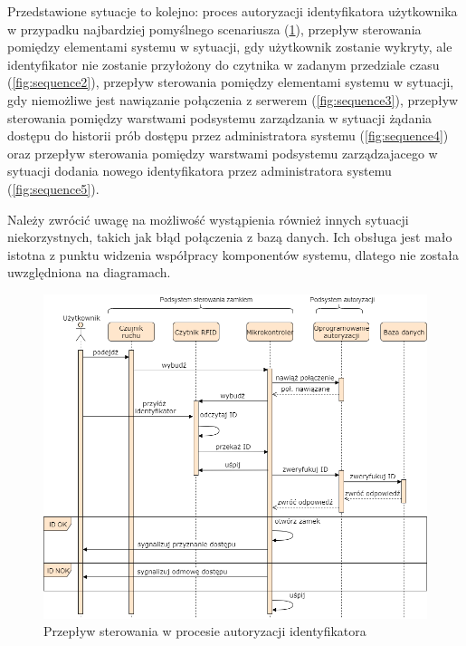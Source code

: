             Przedstawione sytuacje to kolejno: proces autoryzacji identyfikatora użytkownika w przypadku najbardziej pomyślnego scenariusza (\ref{fig:sequence1}), przepływ sterowania pomiędzy elementami systemu w sytuacji, gdy użytkownik zostanie wykryty, ale identyfikator nie zostanie przyłożony do czytnika w zadanym przedziale czasu (\ref{fig:sequence2}), przepływ sterowania pomiędzy elementami systemu w sytuacji, gdy niemożliwe jest nawiązanie połączenia z serwerem (\ref{fig:sequence3}), przepływ sterowania pomiędzy warstwami podsystemu zarządzania w sytuacji żądania dostępu do historii prób dostępu przez administratora systemu (\ref{fig:sequence4}) oraz przepływ sterowania pomiędzy warstwami podsystemu zarządzajacego w sytuacji dodania nowego identyfikatora przez administratora systemu (\ref{fig:sequence5}).

            Należy zwrócić uwagę na możliwość wystąpienia również innych sytuacji niekorzystnych, takich jak błąd połączenia z bazą danych. Ich obsługa jest mało istotna z punktu widzenia współpracy komponentów systemu, dlatego nie została uwzględniona na diagramach.

            \begin{figure}[]
                \includegraphics[width=\linewidth]{chapters/images/sequence1.png}
                \caption{Przepływ sterowania w procesie autoryzacji identyfikatora}
                \label{fig:sequence1}
            \end{figure}

